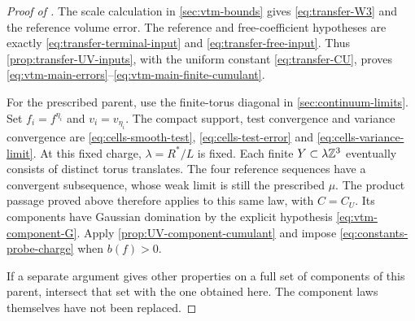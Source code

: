 \begin{proof}[Proof of ]
The scale calculation in \cref{sec:vtm-bounds} gives
\eqref{eq:transfer-W3} and the reference volume error.
The reference and free-coefficient hypotheses are exactly
\eqref{eq:transfer-terminal-input} and \eqref{eq:transfer-free-input}.
Thus \cref{prop:transfer-UV-inputs}, with the uniform constant
\eqref{eq:transfer-CU}, proves
\eqref{eq:vtm-main-errors}--\eqref{eq:vtm-main-finite-cumulant}.

For the prescribed parent, use the finite-torus diagonal
in \cref{sec:continuum-limits}. Set
$f_i=f^{\eta_i}$ and $v_i=v_{\eta_i}$.
The compact support, test convergence and variance convergence
are \eqref{eq:cells-smooth-test},
\eqref{eq:cells-test-error} and \eqref{eq:cells-variance-limit}.
At this fixed charge, $\lambda=R^*/L$ is fixed.
Each finite $Y\subset\lambda\mathbb Z^3$ eventually consists of
distinct torus translates. The four reference sequences have
a convergent subsequence, whose weak limit is still the
prescribed $\mu$. The product passage proved above therefore
applies to this same law, with $C=C_U$.
Its components have Gaussian domination by the explicit
hypothesis \eqref{eq:vtm-component-G}.
Apply \cref{prop:UV-component-cumulant} and impose
\eqref{eq:constants-probe-charge} when $b(f)>0$.

If a separate argument gives other properties on a full set
of components of this parent, intersect that set with the
one obtained here. The component laws themselves have not
been replaced.
\end{proof}
\printbibliography

